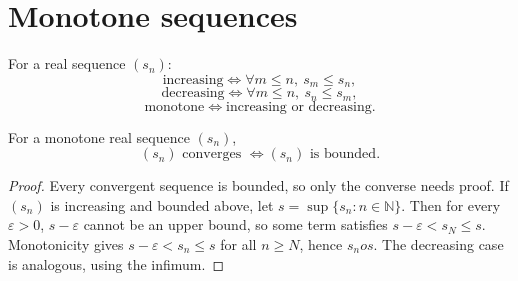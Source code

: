 \section{Monotone sequences}

\begin{definition}
\label{def:monotone-sequences}
For a real sequence $(s_n)$:
\[
\text{increasing} \iff \forall m\le n,\ s_m\le s_n,
\]
\[
\text{decreasing} \iff \forall m\le n,\ s_n\le s_m,
\]
\[
\text{monotone} \iff \text{increasing or decreasing}.
\]
\end{definition}

\begin{theorem}
\label{thm:monotone-convergent-iff-bounded}
For a monotone real sequence $(s_n)$,
\[
(s_n)\text{ converges } \iff (s_n)\text{ is bounded}.
\]
\begin{proof}
Every convergent sequence is bounded, so only the converse needs proof. If $(s_n)$ is
increasing and bounded above, let $s=\sup\{s_n:n\in\mathbb N\}$. Then for every
$\varepsilon>0$, $s-\varepsilon$ cannot be an upper bound, so some term satisfies
$s-\varepsilon<s_N\le s$. Monotonicity gives $s-\varepsilon<s_n\le s$ for all $n\ge N$, hence
$s_n	o s$. The decreasing case is analogous, using the infimum.
\end{proof}
\end{theorem}
